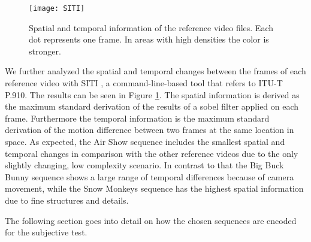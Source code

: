 \begin{figure}[hbt!]
	\centering
	\texttt{[image: SITI]}
	\caption{Spatial and temporal information of the reference video files. Each dot represents one frame. In areas with high densities the color is stronger.}
	\label{fig:SITI}
\end{figure}

We further analyzed the spatial and temporal changes between the frames of each reference video with SITI \cite{web:SITI}, a command-line-based tool that refers to ITU-T P.910. The results can be seen in Figure \ref{fig:SITI}.
The spatial information is derived as the maximum standard derivation of the results of a sobel filter applied on each frame. Furthermore the temporal information is the maximum standard derivation of the motion difference between two frames at the same location in space.
As expected, the Air Show sequence includes the smallest spatial and temporal changes in comparison with the other reference videos due to the only slightly changing, low complexity scenario. In contrast to that the Big Buck Bunny sequence shows a large range of temporal differences because of camera movement, while the Snow Monkeys sequence has the highest spatial information due to fine structures and details.

The following section goes into detail on how the chosen sequences are encoded for the subjective test.


